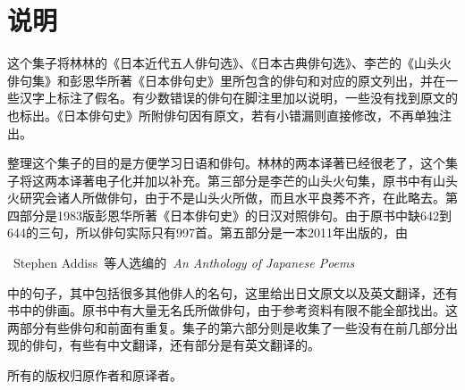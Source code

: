 \documentclass[oneside]{memoir} %
\title{\large\fontsize{80}{60}\selectfont{\FF 俳句}} %
\author{} %
\begin{document}
\thispagestyle{empty} %


\newpage %

\tableofcontents* %

\chapter*{\FK 说明}

 {\FS
  这个集子将林林的《日本近代五人俳句选》、《日本古典俳句选》、李芒的《山头火俳句集》和彭恩华所著《日本俳句史》里所包含的俳句和对应的原文列出，并在一些汉字上标注了假名。有少数错误的俳句在脚注里加以说明，一些没有找到原文的也标出。《日本俳句史》所附俳句因有原文，若有小错漏则直接修改，不再单独注出。

  整理这个集子的目的是方便学习日语和俳句。林林的两本译著已经很老了，这个集子将这两本译著电子化并加以补充。第三部分是李芒的山头火句集，原书中有山头火研究会诸人所做俳句，由于不是山头火所做，而且水平良莠不齐，在此略去。第四部分是1983版彭恩华所著《日本俳句史》的日汉对照俳句。由于原书中缺642到644的三句，所以俳句实际只有997首。第五部分是一本2011年出版的，由}~Stephen Addiss~{\FS 等人选编的}~\emph{An Anthology of Japanese Poems}~{\FS 中的句子，其中包括很多其他俳人的名句，这里给出日文原文以及英文翻译，还有书中的俳画。原书中有大量无名氏所做俳句，由于参考资料有限不能全部找出。这两部分有些俳句和前面有重复。集子的第六部分则是收集了一些没有在前几部分出现的俳句，有些有中文翻译，还有部分是有英文翻译的。

所有的版权归原作者和原译者。

}







\end{document}
